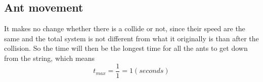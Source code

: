 \documentclass{article}
\begin{document}
\subsection{Ant movement}
It makes no change whether there is a collide or not, since their speed are the same and the total system is not different from what it originally is than after the collision. So the time will then be the longest time for all the ants to get down from the string, which means
\[
	t_{max} = \frac{1}{1} = 1 (seconds)
\]	
\end{document}
